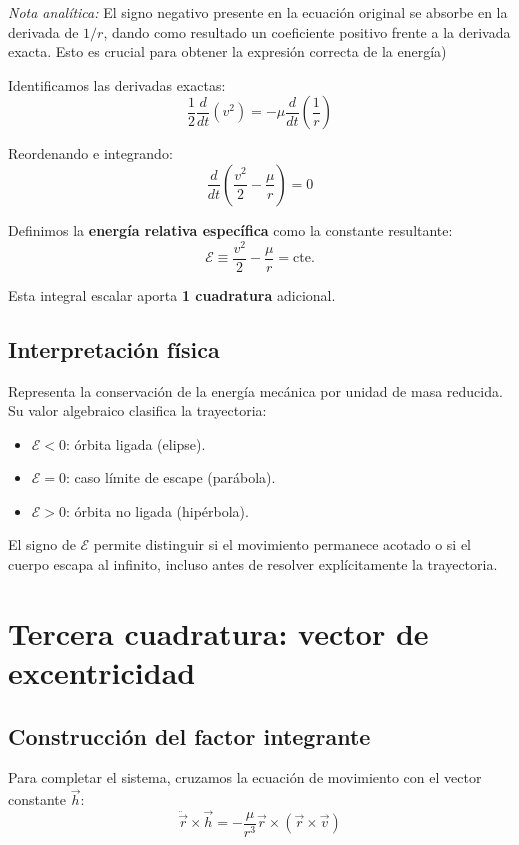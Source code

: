 \textit{Nota analítica:} El signo negativo presente en la ecuación original se absorbe en la derivada de $1/r$, dando como resultado un coeficiente positivo frente a la derivada exacta. Esto es crucial para obtener la expresión correcta de la energía)

Identificamos las derivadas exactas:
\[
\frac{1}{2}\frac{d}{dt}(v^2) = -\mu \frac{d}{dt}\left(\frac{1}{r}\right)
\]

Reordenando e integrando:
\[
\frac{d}{dt}\left(\frac{v^2}{2} - \frac{\mu}{r}\right) = 0
\]

Definimos la \textbf{energía relativa específica} como la constante resultante:
\[
\mathcal{E} \equiv \frac{v^2}{2} - \frac{\mu}{r} = \text{cte.}
\]

Esta integral escalar aporta \textbf{1 cuadratura} adicional.

\subsection{Interpretación física}
Representa la conservación de la energía mecánica por unidad de masa reducida. Su valor algebraico clasifica la trayectoria:
\begin{itemize}
    \item \(\mathcal{E} < 0\): órbita ligada (elipse).
    \item \(\mathcal{E} = 0\): caso límite de escape (parábola).
    \item \(\mathcal{E} > 0\): órbita no ligada (hipérbola).
\end{itemize}

\begin{importante}
El signo de \(\mathcal{E}\) permite distinguir si el movimiento permanece acotado o si el cuerpo escapa al infinito, incluso antes de resolver explícitamente la trayectoria.
\end{importante}

\section{Tercera cuadratura: vector de excentricidad}
\subsection{Construcción del factor integrante}
Para completar el sistema, cruzamos la ecuación de movimiento con el vector constante \(\vec{h}\):
\[
\ddot{\vec{r}} \times \vec{h} = -\frac{\mu}{r^3}\vec{r} \times (\vec{r} \times \vec{v})
\]

